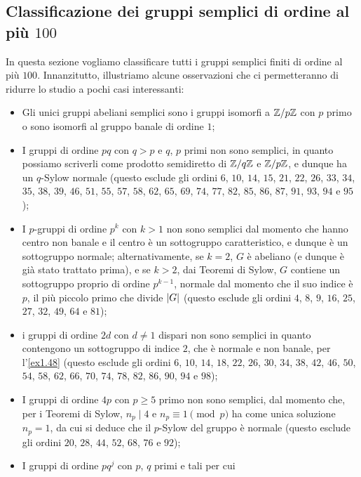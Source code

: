 \documentclass[11pt]{scrartcl}
\begin{document}
	\newpage
	
	\subsection{Classificazione dei gruppi semplici di ordine al più $100$}
	
	In questa sezione vogliamo classificare tutti i gruppi semplici finiti di 
	ordine al più $100$. Innanzitutto, illustriamo alcune osservazioni che
	ci permetteranno di ridurre lo studio a pochi casi interessanti:
	
	\begin{itemize}
		\item Gli unici gruppi abeliani semplici sono i gruppi isomorfi a ${\mathbb Z}/p{\mathbb Z}$ con $p$ primo o sono isomorfi al gruppo banale di ordine $1$;
		\item I gruppi di ordine $pq$ con $q > p$ e $q$, $p$ primi non sono semplici, in
quanto possiamo scriverli come prodotto semidiretto di $\mathbb{Z}/{q}\mathbb{Z}$ e $\mathbb{Z}/{p}\mathbb{Z}$, e dunque ha un $q$-Sylow normale (questo esclude gli ordini $6$, $10$, $14$, $15$, $21$, $22$, $26$, $33$, $34$, $35$, $38$, $39$, $46$, $51$, $55$, $57$, $58$, $62$, $65$, $69$, $74$, $77$, $82$, $85$, $86$, $87$, $91$, $93$, $94$ e $95$);
		\item I $p$-gruppi di ordine $p^k$ con $k > 1$ non sono semplici dal momento
		che hanno centro non banale e il centro è un sottogruppo caratteristico,
		e dunque è un sottogruppo normale; alternativamente, se $k = 2$, $G$ è abeliano (e dunque è già stato trattato prima), e se $k > 2$, dai Teoremi di Sylow,
		$G$ contiene un sottogruppo proprio di ordine $p^{k - 1}$, normale dal momento che
		il suo indice è $p$, il più piccolo primo che divide $\left\lvert G \right\rvert$ (questo esclude gli ordini $4$, $8$, $9$, $16$, $25$, $27$, $32$, $49$, $64$ e $81$);
		\item i gruppi di ordine $2d$ con $d \neq 1$ dispari non sono semplici in quanto
		contengono un sottogruppo di indice $2$, che è normale e non banale, per 
		l'\autoref{ex1.48} (questo esclude gli ordini $6$, $10$, $14$, $18$, $22$, $26$, $30$, $34$, $38$, $42$, $46$, $50$, $54$, $58$, $62$, $66$, $70$, $74$, $78$, $82$, $86$, $90$, $94$ e $98$);
		\item I gruppi di ordine $4p$ con $p \geq 5$ primo non sono semplici, dal
		momento che, per i Teoremi di Sylow, $n_p \mid 4$ e $n_p \equiv 1 \pmod{p}$ ha
		come unica soluzione $n_p = 1$, da cui si deduce che il $p$-Sylow del gruppo
		è normale (questo esclude gli ordini $20$, $28$, $44$, $52$, $68$, $76$ e $92$);
		\item I gruppi di ordine $p q^j$ con $p$, $q$ primi e tali per cui

\end{itemize}
\end{document}
